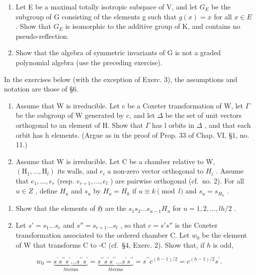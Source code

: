 \begin{enumerate}
\def\labelenumi{\alph{enumi})}
\item
  Let E be a maximal totally isotropic subspace of V, and let \(G_{E}\) be the subgroup of G consisting of the elements g such that \(g(x) = x\) for all \(x \in E\) . Show that \(G_{E}\) is isomorphic to the additive group of K, and contains no pseudo-reflection.
\item
  Show that the algebra of symmetric invariants of G is not a graded polynomial algebra (use the preceding exercise).
\end{enumerate}


In the exercises below (with the exception of Exerc. 3), the assumptions and notation are those of §6.

\begin{enumerate}
\def\labelenumi{\arabic{enumi})}
\item
  Assume that W is irreducible. Let c be a Coxeter transformation of W, let \(\Gamma\) be the subgroup of W generated by c, and let \(\Delta\) be the set of unit vectors orthogonal to an element of H. Show that \(\Gamma\) has l orbits in \(\Delta\) , and that each orbit has h elements. (Argue as in the proof of Prop. 33 of Chap. VI, §1, no. 11.)
\item
  Assume that W is irreducible. Let C be a chamber relative to W, \((\mathrm{H}_{1},\ldots,\mathrm{H}_{l})\) its walls, and \(e_{i}\) a non-zero vector orthogonal to \(H_{i}\) . Assume that \(e_{1},\ldots,e_{r}\) (resp. \(e_{r+1},\ldots,e_{l}\) ) are pairwise orthogonal (cf.~no. 2). For all \(u\in Z\) , define \(H_{u}\) and \(s_{u}\) by \(H_{u}=H_{k}\) if \(u\equiv k\pmod{l}\) and \(s_{u}=s_{H_{u}}\) .
\end{enumerate}

\begin{enumerate}
\def\labelenumi{\alph{enumi})}
\item
  Show that the elements of \(\mathfrak{H}\) are the \(s_1 s_2 \ldots s_{u-1} H_u\) for \(u = 1, 2, \ldots, lh/2\) .
\item
  Let \(s' = s_1 \ldots s_r\) and \(s'' = s_{r+1} \ldots s_l\) , so that \(c = s's''\) is the Coxeter transformation associated to the ordered chamber C. Let \(w_0\) be the element of W that transforms C to -C (cf.~§4, Exerc. 2). Show that, if \(h\) is odd,
\end{enumerate}

\[
w _ {0} = \underbrace {s ^ {\prime} s ^ {\prime \prime} s ^ {\prime} \ldots s ^ {\prime \prime} s ^ {\prime}} _ {h \text {terms}} = \underbrace {s ^ {\prime \prime} s ^ {\prime} s ^ {\prime \prime} \ldots s ^ {\prime} s ^ {\prime \prime}} _ {h \text {terms}} = s ^ {\prime \prime} c ^ {(h - 1) / 2} = c ^ {(h - 1) / 2} s ^ {\prime}.
\]

